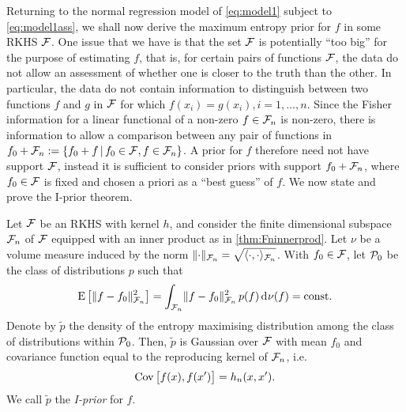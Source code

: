 Returning to the normal regression model of \cref{eq:model1} subject to \cref{eq:model1ass}, we shall now derive the maximum entropy prior for $f$ in some RKHS ${\mathcal F}$.
One issue that we have is that the set ${\mathcal F}$ is potentially ``too big'' for the purpose of estimating $f$, that is, for certain pairs of functions ${\mathcal F}$, the data do not allow an assessment of whether one is closer to the truth than the other.
In particular, the data do not contain information to distinguish between two functions $f$ and $g$ in ${\mathcal F}$ for which $f(x_i) = g(x_i), i=1,\dots,n$.
Since the Fisher information for a linear functional of a non-zero $f \in {\mathcal F}_n$ is non-zero, there is information to allow a comparison between any pair of functions in $f_0 + {\mathcal F}_n := \{f_0 + f \,|\, f_0 \in {\mathcal F}, f \in {\mathcal F}_n \}$.
A prior for $f$ therefore need not have support ${\mathcal F}$, instead it is sufficient to consider priors with support $f_0 + {\mathcal F}_n$, where $f_0 \in {\mathcal F}$ is fixed and chosen a priori as a ``best guess'' of $f$.
We now state and prove the I-prior theorem.

\begin{theorem}
  Let ${\mathcal F}$ be an RKHS with kernel $h$, and consider the finite dimensional subspace ${\mathcal F}_n$ of ${\mathcal F}$ equipped with an inner product as in \cref{thm:Fninnerprod}.
  Let $\nu$ be a volume measure induced by the norm $\lVert\cdot\rVert_{{\mathcal F}_n} = \sqrt{\langle\cdot,\cdot\rangle_{{\mathcal F}_n}}$.
  With $f_0 \in {\mathcal F}$, let ${\mathcal P}_0$ be the class of distributions $p$ such that 
  \[
    \operatorname{E}\big[\lVert f-f_0\rVert^2_{{\mathcal F}_n}\big] = \int_{{\mathcal F}_n} \lVert f-f_0\rVert^2_{{\mathcal F}_n} \, p(f) \operatorname{d}\hspace{0.5pt}\! \nu(f) = \text{const.}\hspace{0.01em}
  \]
  Denote by $\tilde p$ the density of the entropy maximising distribution among the class of distributions within ${\mathcal P}_0$.
  Then, $\tilde p$ is Gaussian over ${\mathcal F}$ with mean $f_0$ and covariance function equal to the reproducing kernel of ${\mathcal F}_n$, i.e.
  \[
    \operatorname{Cov}\big[f(x),f(x')\big] = h_n(x,x').
  \]
  We call $\tilde p$ the \emph{I-prior} for $f$.
\end{theorem}

